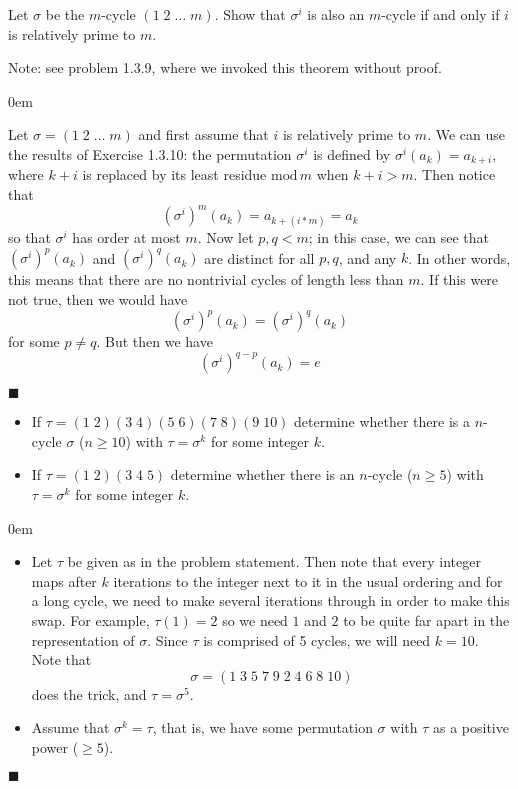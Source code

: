 \documentclass[12pt]{article}
\renewcommand{\qed}{\hfill$\blacksquare$}
\renewenvironment{proof}{\begin{addmargin}[1em]{0em}\begin{newproof}}{\end{newproof}\end{addmargin}\qed}
\newenvironment{problem}[2][Exercise]{\begin{trivlist}
\item[\hskip \labelsep {\bfseries #1}\hskip \labelsep {\bfseries #2.}]}{\end{trivlist}}
\begin{document}
\begin{problem}{1.3.11}
Let $\sigma$ be the $m$-cycle $\left(1\;2\;\ldots \; m\right)$. Show that $\sigma^i$ is also an $m$-cycle if and only if $i$ is relatively prime to $m$.
\end{problem}
{\color{red}Note: see problem 1.3.9, where we invoked this theorem without proof.} \\
\begin{proof}
Let $\sigma = \left(1\;2\;\ldots \;m\right)$ and first assume that $i$ is relatively prime to $m$. We can use the results of Exercise 1.3.10: the permutation $\sigma^i$ is defined by $\sigma^i\left(a_k\right) = a_{k+i}$, where $k+i$ is replaced by its least residue $\text{mod} \, m$ when $k+i>m$. Then notice that $$ \left(\sigma^i\right)^m\left(a_k\right) = a_{k+\left(i*m\right)} = a_k $$ so that $\sigma^i$ has order at most $m$. Now let $p,q<m$; in this case, we can see that $\left(\sigma^i\right)^p\left(a_k\right)$ and $\left(\sigma^i\right)^q\left(a_k\right)$ are distinct for all $p, q$, and any $k$. In other words, this means that there are no nontrivial  cycles of length less than $m$. If this were not true, then we would have $$ \left(\sigma^i\right)^p\left(a_k\right) = \left(\sigma^i\right)^q\left(a_k\right) $$ for some $p\neq q$. But then we have $$ \left(\sigma^i\right)^{q-p}\left(a_k\right) = e $$

\end{proof}




\begin{problem}{1.3.12}
\begin{itemize}
  \item If $\tau = \left(1\;2\right)\left(3\;4\right)\left(5\;6\right)\left(7\;8\right)\left(9\;10\right) $ determine whether there is a $n$-cycle $\sigma$ ($n\geq 10$) with $\tau = \sigma^k$ for some integer $k$.
  \item If $\tau=\left(1\;2\right)\left(3\;4\;5\right)$ determine whether there is an $n$-cycle ($n\geq 5$) with $\tau=\sigma^k$ for some integer $k$.
\end{itemize}
\end{problem}
\begin{proof}
\begin{itemize}
  \item Let $\tau$ be given as in the problem statement. Then note that every integer maps after $k$ iterations to the integer next to it in the usual ordering and for a long cycle, we need to make several iterations through in order to make this swap. For example, $\tau\left(1\right)=2$ so we need $1$ and $2$ to be quite far apart in the representation of $\sigma$. Since $\tau$ is comprised of 5 cycles, we will need $k=10$. Note that
  $$ \sigma = \left(1\;3\;5\;7\;9\;2\;4\;6\;8\;10\right) $$ does the trick, and $\tau = \sigma^5$.
  \item Assume that $\sigma^k=\tau$, that is, we have some permutation $\sigma$ with $\tau$ as a positive power ($\geq 5$).
\end{itemize}
\end{proof}
\end{document}
